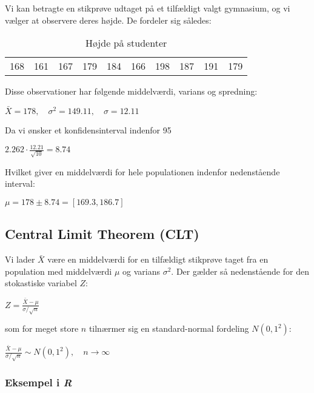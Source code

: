 \documentclass{article}
\newcommand{\mellemrum}{\vspace{2 ex}}
\newcommand{\cent}[1]{ \mellemrum \begin{center} #1\end{center} \mellemrum }
\begin{document}
	Vi kan betragte en stikprøve udtaget på et tilfældigt valgt gymnasium, og vi vælger at observere deres højde. De fordeler sig således:
	
	\begin{table}[H]
		\centering
		\begin{tabular}{llllllllll}
			168 & 161 & 167 & 179 & 184 & 166 & 198 & 187 & 191 & 179
		\end{tabular}
	\caption{Højde på studenter}
	\end{table}
	
	Disse observationer har følgende middelværdi, varians og spredning:
	
	\cent{$ \bar{X} = 178, \quad \sigma^2 = 149.11, \quad \sigma = 12.11 $}
	
	Da vi ønsker et konfidensinterval indenfor 95%
	
	\cent{$ 2.262 \cdot \frac{12.21}{\sqrt{10}} = 8.74$}
	
	Hvilket giver en middelværdi for hele populationen indenfor nedenstående interval:
	
	\cent{$\mu = 178 \pm 8.74 = [169.3,186.7]$}
	
	\subsection{Central Limit Theorem (CLT)}
	
	Vi lader $ \bar{X} $ være en middelværdi for en tilfældigt stikprøve taget fra en population med middelværdi $\mu$ og varians $\sigma^2$. Der gælder så nedenstående for den stokastiske variabel $Z$: 
	
	\cent{$ Z = \frac{\bar{X} - \mu}{\sigma / \sqrt{n}} $}
	
	som for meget store $n$ tilnærmer sig en standard-normal fordeling $N(0,1^2)$:
	
	\cent{$\frac{\bar{X} - \mu}{\sigma / \sqrt{n}} \sim N(0,1^2), \quad n\rightarrow \infty$}
	
	
	\subsubsection*{Eksempel i \textit{R}}
	
\end{document}
